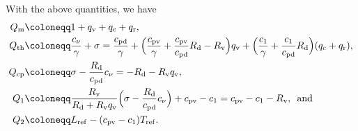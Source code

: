 \documentclass[10pt]{amsart}
\theoremstyle{plain}
\theoremstyle{definition}
\theoremstyle{thm}
\numberwithin{equation}{section}
\newcommand{\tand}{\enspace \text{and} \enspace}
\newcommand{\rd}{\mathrm{d}}
\renewcommand{\rm}{\mathrm{m}}
\newcommand{\rr}{\mathrm{r}}
\newcommand{\rv}{\mathrm{v}}
\newcommand{\rc}{\mathrm{c}}
\newcommand{\rth}{\mathrm{th}}
\newcommand{\rcp}{\mathrm{cp}}
\newcommand{\rref}{\mathrm{ref}}
\newcommand{\rpd}{\mathrm{pd}}
\newcommand{\rpv}{\mathrm{pv}}
\begin{document}
With the above quantities, we have
\begin{equation*}
    \begin{aligned}
        Q_\rm
        &\coloneqq 1 + q_\rv + q_\rc + q_\rr,\\
        Q_\rth
        &\coloneqq \frac{c_\nu}{\gamma} + \sigma = \frac{c_\rpd}{\gamma} + \Bigl(\frac{c_\rpv}{\gamma} + \frac{c_\rpv}{c_\rpd} R_\rd - R_\rv\Bigr) q_\rv + \Bigl(\frac{c_1}{\gamma} + \frac{c_1}{c_\rpd}R_\rd\Bigr)(q_\rc + q_\rr),\\
        Q_\rcp
        &\coloneqq \sigma - \frac{R_\rd}{c_\rpd} c_\nu = - R_\rd - R_\rv q_\rv,\\
        Q_1
        &\coloneqq \frac{R_\rv}{R_\rd + R_\rv q_\rv}\Bigl(\sigma - \frac{R_\rd}{c_\rpd} c_\nu\Bigr) + c_\rpv - c_1 = c_\rpv - c_1 - R_\rv, \tand\\
        Q_2 
        &\coloneqq L_\rref - (c_\rpv - c_1) T_\rref.
    \end{aligned}
\end{equation*}
\end{document}
